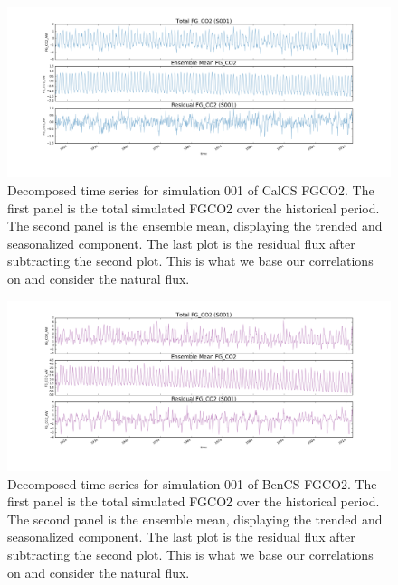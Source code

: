 \documentclass[12pt]{article}
\begin{document}
\clearpage
\begin{figure}[!h]
	\centering
	\includegraphics[width=\linewidth]{../../figs/calcs/timeseries/CalCS-FG_CO2-timeseries-decomposition.png}
	\caption{Decomposed time series for simulation 001 of CalCS FGCO2. The first panel is the total simulated FGCO2 over the historical period. The second panel is the ensemble mean, displaying the trended and seasonalized component. The last plot is the residual flux after subtracting the second plot. This is what we base our correlations on and consider the natural flux.}
	\label{fig:CalCS-decomposition}
\end{figure}
\begin{figure}[!h]
	\centering
	\includegraphics[width=\linewidth]{../../figs/bencs/timeseries/BenCS-FG_CO2-timeseries-decomposition.png}
	\caption{Decomposed time series for simulation 001 of BenCS FGCO2. The first panel is the total simulated FGCO2 over the historical period. The second panel is the ensemble mean, displaying the trended and seasonalized component. The last plot is the residual flux after subtracting the second plot. This is what we base our correlations on and consider the natural flux.}
	\label{fig:BenCS-decomposition}
\end{figure}
\end{document}
